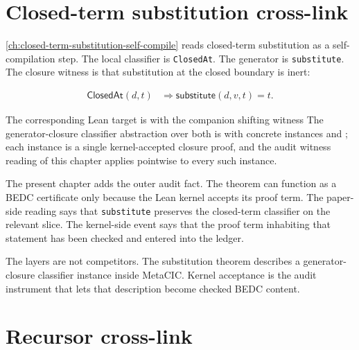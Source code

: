 \section{Closed-term substitution cross-link}
\label{sec:kernel-audit-witness-substitution}

\autoref{ch:closed-term-substitution-self-compile} reads closed-term
substitution as a self-compilation step. The local classifier is
\texttt{ClosedAt}. The generator is \texttt{substitute}. The closure witness is
that substitution at the closed boundary is inert:

$$
\begin{aligned}
\mathsf{ClosedAt}(d,t)
&\Rightarrow
\mathsf{substitute}(d,v,t)=t.
\end{aligned}
$$

The corresponding Lean target is
with the companion shifting witness
The generator-closure classifier abstraction over both is
with concrete instances
 and
;
each instance is a single kernel-accepted closure proof, and the audit witness reading of this chapter applies pointwise to every such instance.

The present chapter adds the outer audit fact. The theorem can function as a
BEDC certificate only because the Lean kernel accepts its proof term. The
paper-side reading says that \texttt{substitute} preserves the closed-term
classifier on the relevant slice. The kernel-side event says that the proof
term inhabiting that statement has been checked and entered into the ledger.

The layers are not competitors. The substitution theorem describes a
generator-closure classifier instance inside MetaCIC. Kernel acceptance is the
audit instrument that lets that description become checked BEDC content.


\section{Recursor cross-link}
\label{sec:kernel-audit-witness-recursor}

